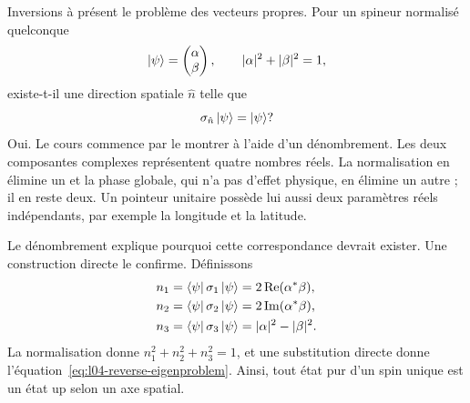 Inversions à présent le problème des vecteurs propres. Pour un spineur normalisé quelconque
\begin{equation}
  \left\lvert\psi\right\rangle=
  \begin{pmatrix}\alpha\\\beta\end{pmatrix},
  \qquad
  |\alpha|^2+|\beta|^2=1,
  \label{eq:l04-general-spinor}
\end{equation}
existe-t-il une direction spatiale \(\hat n\) telle que
\begin{equation}
  \sigma_{\hat n}\left\lvert\psi\right\rangle=\left\lvert\psi\right\rangle?
  \label{eq:l04-reverse-eigenproblem}
\end{equation}
Oui. Le cours commence par le montrer à l’aide d’un dénombrement. Les deux composantes complexes représentent quatre nombres réels. La normalisation en élimine un et la phase globale, qui n’a pas d’effet physique, en élimine un autre ; il en reste deux. Un pointeur unitaire possède lui aussi deux paramètres réels indépendants, par exemple la longitude et la latitude.

\begin{classroomqa}
\end{classroomqa}

\begin{classroomqa}
\end{classroomqa}

Le dénombrement explique pourquoi cette correspondance devrait exister. Une construction directe le confirme. Définissons
\begin{align}
  n_1&=\left\langle\psi\right\rvert\sigma_1\left\lvert\psi\right\rangle
      =2\operatorname{Re}(\alpha^*\beta),
  \notag\\
  n_2&=\left\langle\psi\right\rvert\sigma_2\left\lvert\psi\right\rangle
      =2\operatorname{Im}(\alpha^*\beta),
  \notag\\
  n_3&=\left\langle\psi\right\rvert\sigma_3\left\lvert\psi\right\rangle
      =|\alpha|^2-|\beta|^2.
  \label{eq:l04-bloch-components}
\end{align}
La normalisation donne \(n_1^2+n_2^2+n_3^2=1\), et une substitution directe donne l’équation~\eqref{eq:l04-reverse-eigenproblem}. Ainsi, tout état pur d’un spin unique est un état up selon un axe spatial.

